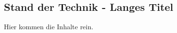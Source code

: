 \begin{showRelatedWork}%
%
\chapter[Stand der Technik - Kurztitel für Inhaltsverzeichnis und Kolumnentitel]{Stand der Technik - Langes Titel}%
\label{chap:StandDerTechnik}
%
Hier kommen die Inhalte rein.
%
%
%
%
\end{showRelatedWork}%
